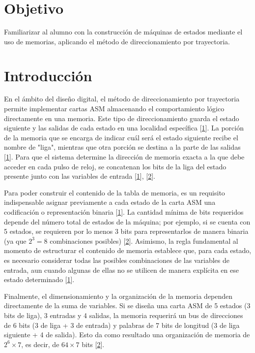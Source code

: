 \documentclass[12pt, letterpaper]{article}
\begin{document}


\section*{Objetivo}

Familiarizar al alumno con la construcción de máquinas de estados mediante el uso de
memorias, aplicando el método de direccionamiento por trayectoria.

\section*{Introducción}

En el ámbito del diseño digital, el método de direccionamiento por trayectoria permite implementar cartas ASM almacenando el comportamiento lógico directamente en una memoria. Este tipo de direccionamiento guarda el estado siguiente y las salidas de cada estado en una localidad específica [\protect\hyperlink{1-diana-karen}{1}]. La porción de la memoria que se encarga de indicar cuál será el estado siguiente recibe el nombre de "liga", mientras que otra porción se destina a la parte de las salidas [\protect\hyperlink{1-diana-karen}{1}]. Para que el sistema determine la dirección de memoria exacta a la que debe acceder en cada pulso de reloj, se concatenan los bits de la liga del estado presente junto con las variables de entrada [\protect\hyperlink{1-diana-karen}{1}], [\protect\hyperlink{2-facultad-ingenieria}{2}].

Para poder construir el contenido de la tabla de memoria, es un requisito indispensable asignar previamente a cada estado de la carta ASM una codificación o representación binaria [\protect\hyperlink{1-diana-karen}{1}]. La cantidad mínima de bits requeridos depende del número total de estados de la máquina; por ejemplo, si se cuenta con 5 estados, se requieren por lo menos 3 bits para representarlos de manera binaria (ya que $2^3 = 8$ combinaciones posibles) [\protect\hyperlink{2-facultad-ingenieria}{2}]. Asimismo, la regla fundamental al momento de estructurar el contenido de memoria establece que, para cada estado, es necesario considerar todas las posibles combinaciones de las variables de entrada, aun cuando algunas de ellas no se utilicen de manera explícita en ese estado determinado [\protect\hyperlink{1-diana-karen}{1}].

Finalmente, el dimensionamiento y la organización de la memoria dependen directamente de la suma de variables. Si se diseña una carta ASM de 5 estados (3 bits de liga), 3 entradas y 4 salidas, la memoria requerirá un bus de direcciones de 6 bits (3 de liga + 3 de entrada) y palabras de 7 bits de longitud (3 de liga siguiente + 4 de salida). Esto da como resultado una organización de memoria de $2^6 \times 7$, es decir, de $64 \times 7$ bits [\protect\hyperlink{2-facultad-ingenieria}{2}].
\end{document}
